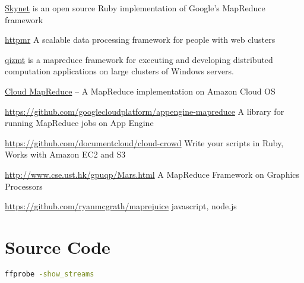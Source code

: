 \documentclass[letter,11pt,onecolumn]{book}
\begin{document}
\href{http://skynet.rubyforge.org/}{Skynet} is an open source Ruby implementation of Google’s MapReduce framework


\href{https://code.google.com/p/httpmr/}{httpmr} A scalable data processing framework for people with web clusters


\href{https://code.google.com/p/qizmt/}{qizmt} is a mapreduce framework for executing and developing distributed computation applications on large clusters of Windows servers.




\href{https://code.google.com/p/cloudmapreduce/}{Cloud MapReduce} -- A MapReduce implementation on Amazon Cloud OS

\url{https://github.com/googlecloudplatform/appengine-mapreduce}
A library for running MapReduce jobs on App Engine




\url{https://github.com/documentcloud/cloud-crowd}
Write your scripts in Ruby, Works with Amazon EC2 and S3



\url{http://www.cse.ust.hk/gpuqp/Mars.html}
A MapReduce Framework on Graphics Processors


\url{https://github.com/ryanmcgrath/maprejuice}
javascript, node.js

\chapter{Source Code}

\begin{lstlisting}[language=bash]
ffprobe -show_streams
\end{lstlisting}
\end{document}

